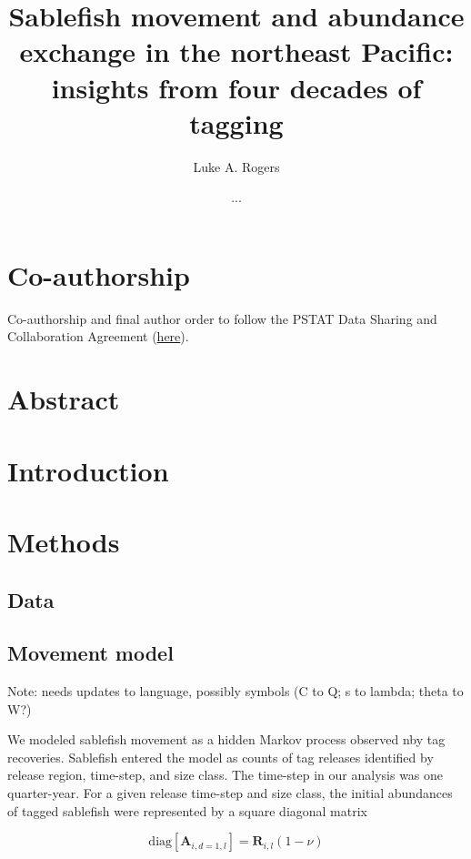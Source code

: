 \documentclass{article}
\title{Sablefish movement and abundance exchange in the northeast Pacific: insights from four decades of tagging}
\author[1]{Luke A. Rogers}
\author[]{...}
\affil[1]{Pacific Biological Station, Fisheries and Oceans Canada, Nanaimo, BC, V9T 6N7, Canada}
\begin{document}
\maketitle
\linenumbers
\setcounter{secnumdepth}{0}

\section{Co-authorship}
Co-authorship and final author order to follow the PSTAT Data Sharing and Collaboration Agreement (\href{https://docs.google.com/document/d/1AXIhq6lO_qOPf7q67s_SiDOD6qEfih0COtxQZo7v-Hc/edit?usp=sharing}{here}).

\section{Abstract}

\section{Introduction}

\section{Methods}

\subsection{Data}

\subsection{Movement model}

\noindent Note: needs updates to language, possibly symbols (C to Q; s to lambda; theta to W?) 

We modeled sablefish movement as a hidden Markov process \cite[][]{langrock-2012-flexible-practical} observed nby tag recoveries. Sablefish entered the model as counts of tag releases identified by release region, time-step, and size class. The time-step in our analysis was one quarter-year. For a given release time-step and size class, the initial abundances of tagged sablefish were represented by a square diagonal matrix 

\begin{equation}
  \label{eq:abundance-initial}
  \mathrm{diag} \! \left[\boldsymbol{A}_{i,d=1,l}\right] = \boldsymbol{R}_{i,l} \left(1 - \nu \right)
\end{equation}
\end{document}

